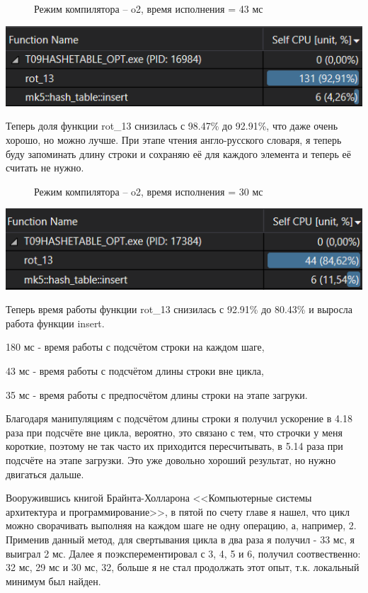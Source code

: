 \documentclass[a4paper,12pt]{article}
\begin{document}
\begin{center}
	\begin{figure}[h]
		\caption{Режим компилятора -- o2, время исполнения = 43 мс}
	\end{figure}
	\includegraphics[scale = 1]{2_test.png}
\end{center}
Теперь доля функции rot\_13 снизилась с 98.47\% до 92.91\%, что даже очень хорошо, но можно лучше. При этапе чтения англо-русского словаря, я теперь буду запоминать длину строки и сохраняю её для каждого элемента и теперь её считать не нужно.
\begin{center}
	\begin{figure}[h]
		\caption{Режим компилятора -- o2, время исполнения = 30 мс}
	\end{figure}
	\includegraphics[scale = 1]{3_test.png}
\end{center}

Теперь время работы функции rot\_13 снизилась с 92.91\% до 80.43\% и выросла работа функции insert.

180 мс - время работы с подсчётом строки на каждом шаге,

43 мс - время работы с подсчётом длины строки вне цикла, 

35  мс - время работы с предпосчётом длины строки на этапе загруки.

Благодаря манипуляциям с подсчётом длины строки я получил ускорение в 4.18 раза при подсчёте вне цикла, вероятно, это связано с тем, что строчки у меня короткие, поэтому не так часто их приходится пересчитывать,
в 5.14 раза при подсчёте на этапе загрузки. 
Это уже довольно хороший результат, но нужно двигаться дальше. 

Вооружившись книгой Брайнта-Холларона <<Компьютерные системы архитектура и программирование>>, в пятой по счету главе я нашел, что цикл можно сворачивать выполняя на каждом шаге не одну операцию, а, например, 2. Применив данный метод, для свертывания цикла в два раза я получил - 33 мс, я выиграл 2 мс. Далее я поэксперементировал с 3, 4, 5 и 6, получил соотвественно: 32 мс, 29 мс и 30 мс, 32, больше я не стал продолжать этот опыт, т.к. локальный минимум был найден. 
\end{document}
